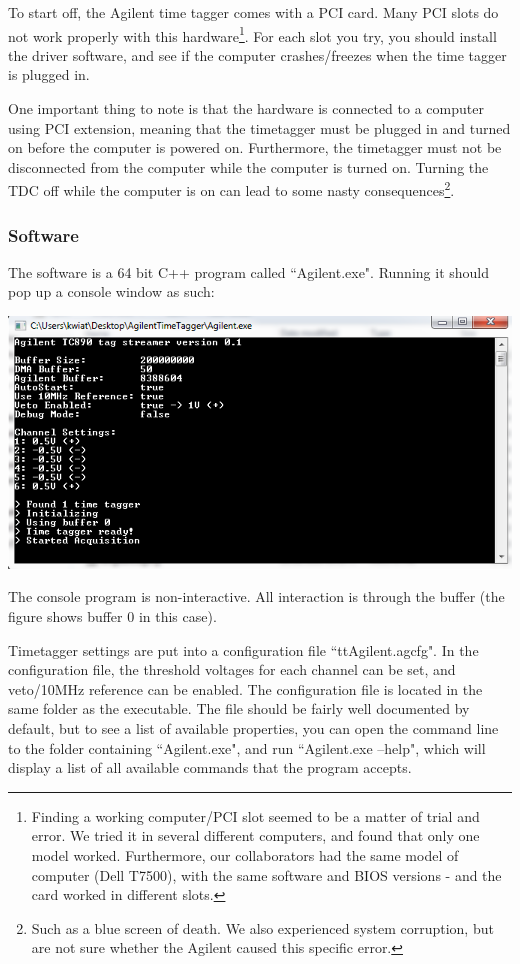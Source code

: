 \documentclass[10pt]{article}
\begin{document}
To start off, the Agilent time tagger comes with a PCI card. Many PCI slots do not work properly with this
hardware\footnote{Finding a working computer/PCI slot seemed to be a matter of trial and error. 
We tried it in several different computers, and found that only one model worked. Furthermore, our collaborators had
the same model of computer (Dell T7500), with the same software and BIOS versions - and the card worked in different slots.}.
For each slot you try, you should install the driver software, and see if the computer crashes/freezes when the time tagger is
plugged in.

One important thing to note is that the hardware is connected to a computer using PCI extension, meaning that the timetagger
must be plugged in and turned on before the computer is powered on. Furthermore, the timetagger must not be disconnected
from the computer while the computer is turned on. Turning the TDC off while the computer is on can lead to some nasty
consequences\footnote{Such as a blue screen of death. We also experienced system corruption, but are not sure whether the 
Agilent caused this specific error.}.
\subsubsection{Software}

The software is a 64 bit C++ program called ``Agilent.exe". Running it should pop up a console window as such:
\begin{center}
\includegraphics[width=\textwidth]{agilentconsole.png}
\end{center}
The console program is non-interactive. All interaction is through the buffer (the figure shows buffer 0 in this case).

Timetagger settings are put into a configuration file ``ttAgilent.agcfg".
In the configuration file, the threshold voltages for each channel can be set, and veto/10MHz reference can be enabled.
The configuration file is located in the same folder as the executable. The file should be fairly well documented by default,
but to see a list of available properties, you can open the command line to the folder containing ``Agilent.exe", and
run ``Agilent.exe --help", which will display a list of all available commands that the program accepts.
\end{document}

